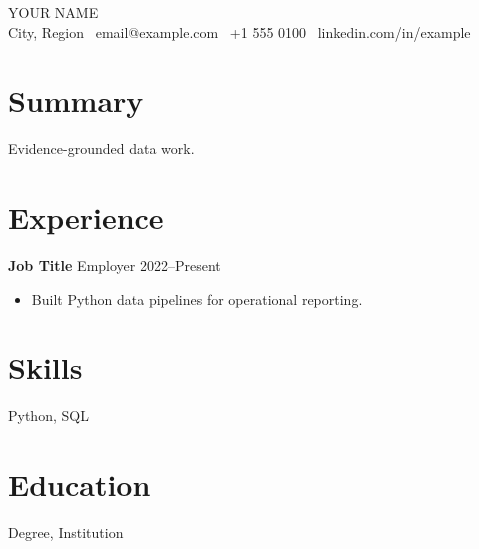 \documentclass[10pt,letterpaper]{article}
\begin{document}
\begin{center}
{\LARGE YOUR NAME}\\
City, Region \textbar\ email@example.com \textbar\ +1 555 0100 \textbar\ linkedin.com/in/example
\end{center}
\section*{Summary}
Evidence-grounded data work.
\section*{Experience}
\textbf{Job Title} \hfill Employer \hfill 2022--Present
\begin{itemize}
  \item Built Python data pipelines for operational reporting.
\end{itemize}
\section*{Skills}
Python, SQL
\section*{Education}
Degree, Institution
\end{document}
